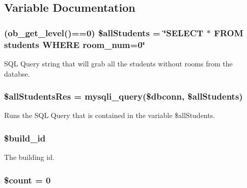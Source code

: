 \subsection{\-Variable \-Documentation}
\hypertarget{autoStudent_8php_acdd85a1abce7d32e53f2028aef2fdf30}{
\subsubsection[{\$all\-Students}]{ (ob\-\_\-get\-\_\-level()==0) \$all\-Students = \char`\"{}\-S\-E\-L\-E\-C\-T $\ast$ \-F\-R\-O\-M students \-W\-H\-E\-R\-E room\-\_\-num=0\char`\"{}}}\label{autoStudent_8php_acdd85a1abce7d32e53f2028aef2fdf30}
\-S\-Q\-L \-Query string that will grab all the students without rooms from the databse. \hypertarget{autoStudent_8php_a5b42ae37453b4cb0a7b66ecf7f835c1b}{
\subsubsection[{\$all\-Students\-Res}]{\setlength{\rightskip}{0pt plus 5cm}\$all\-Students\-Res = mysqli\-\_\-query(\$dbconn, \$all\-Students)}}\label{autoStudent_8php_a5b42ae37453b4cb0a7b66ecf7f835c1b}
\-Runs the \-S\-Q\-L \-Query that is contained in the variable \$all\-Students. \hypertarget{autoStudent_8php_a6a8268a00832c2b9fb19639cef3b55c3}{
\subsubsection[{\$build\-\_\-id}]{\setlength{\rightskip}{0pt plus 5cm}\$build\-\_\-id}}\label{autoStudent_8php_a6a8268a00832c2b9fb19639cef3b55c3}
\-The building id. \hypertarget{autoStudent_8php_af789423037bbc89dc7c850e761177570}{
\subsubsection[{\$count}]{\setlength{\rightskip}{0pt plus 5cm}\$count = 0}}\label{autoStudent_8php_af789423037bbc89dc7c850e761177570}
